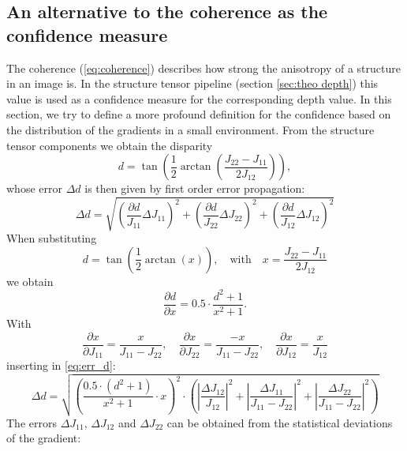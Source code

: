 \documentclass  [
  paper    = a4,
  BCOR     = 10mm,
  twoside,
  fontsize = 12pt,
  fleqn,
  toc      = bibnumbered,
  toc      = listofnumbered,
  numbers  = noendperiod,
  headings = normal,
  listof   = leveldown,
  version  = 3.03
]                                       {scrreprt}
\begin{document}
 \subsection{An alternative to the coherence as the confidence measure}
 \label{sec:alternative}
 The coherence (\ref{eq:coherence}) describes how strong the anisotropy of a structure in an image is. In the structure tensor pipeline (section \ref{sec:theo depth}) this value is used as a confidence measure for the corresponding depth value. In this section, we try to define a more profound definition for the confidence based on the distribution of the gradients in a small environment.
 From the structure tensor components we obtain the disparity 
 \begin{equation}\label{eq:disparity2}
 d = \tan\left(\frac{1}{2} \arctan\left( \frac{J_{22}-J_{11}}{2J_{12}}\right)\right),
 \end{equation}
 whose error $\Delta d$ is then given by first order error propagation:
 \begin{equation}\label{eq:err_d}
 \Delta d = \sqrt{\left(\frac{\partial d}{J_{11}}  \Delta J_{11}\right)^2 + \left(\frac{\partial d}{J_{22}}  \Delta J_{22}\right)^2 + \left(\frac{\partial d}{J_{12}} \Delta J_{12}\right)^2 }
 \end{equation}
 When substituting
 \begin{equation}\label{eq:disparity2}
 d = \tan\left(\frac{1}{2} \arctan\left( x\right)\right),\quad \text{with}\quad  x = \frac{J_{22}-J_{11}}{2J_{12}}
 \end{equation}
 we obtain
 \begin{equation}\label{key}
 \frac{\partial d}{\partial x} = 0.5\cdot \frac{d^2+1}{x^2+1}.
 \end{equation}
 With
 \begin{equation}\label{key}
 \frac{\partial x}{\partial J_{11}} = \frac{x}{J_{11} - J_{22}},\quad \frac{\partial x}{\partial J_{22}} = \frac{-x}{J_{11} - J_{22}},\quad  \frac{\partial x}{\partial J_{12}} = \frac{x}{J_{12}}
 \end{equation}
 inserting in \ref{eq:err_d}:
 \begin{equation}\label{eq:deviation_d}
 \Delta d =\sqrt{\left(\frac{0.5\cdot(d^2+1)}{x^2+1}\cdot x\right)^2 \cdot \left(\left|\frac{\Delta J_{12}}{J_{12}}\right|^2 + \left|\frac{\Delta J_{11}}{J_{11}-J_{22}}\right|^2 + \left|\frac{\Delta J_{22}}{J_{11}-J_{22}}\right|^2\right)}
 \end{equation}
 The errors $\Delta J_{11}$, $\Delta J_{12}$ and $\Delta J_{22}$ can be obtained from the statistical deviations of the gradient:
\end{document}
